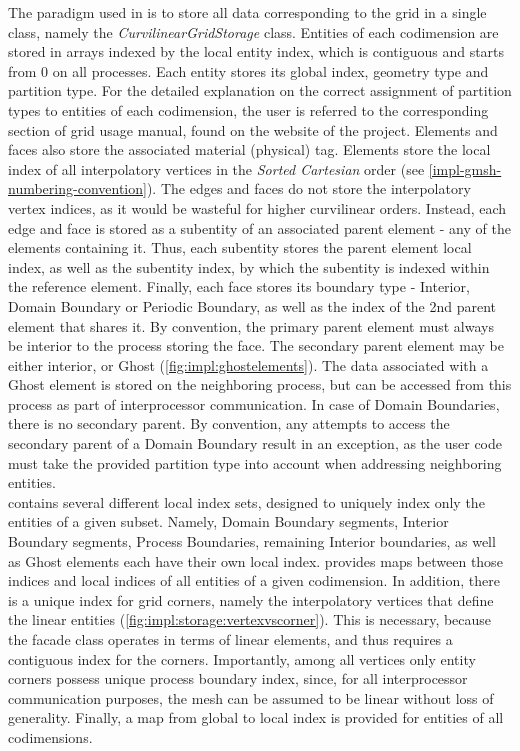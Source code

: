 \noindent
The paradigm used in \curvgrid{} is to store all data corresponding to the grid in a single class, namely the \textit{CurvilinearGridStorage} class. Entities of each codimension are stored in arrays indexed by the local entity index, which is contiguous and starts from 0 on all processes. Each entity stores its global index, geometry type and partition type. For the detailed explanation on the correct assignment of partition types to entities of each codimension, the user is referred to the corresponding section of \dune{} grid usage manual, found on the website of the project. Elements and faces also store the associated material (physical) tag. Elements store the local index of all interpolatory vertices in the \textit{Sorted Cartesian} order (see \cref{impl-gmsh-numbering-convention}). The edges and faces do not store the interpolatory vertex indices, as it would be wasteful for higher curvilinear orders. Instead, each edge and face is stored as a subentity of an associated parent element - any of the elements containing it. Thus, each subentity stores the parent element local index, as well as the subentity index, by which the subentity is indexed within the reference element. Finally, each face stores its boundary type - Interior, Domain Boundary or Periodic Boundary, as well as the index of the 2nd parent element that shares it. By convention, the primary parent element must always be interior to the process storing the face. The secondary parent element may be either interior, or Ghost (\cref{fig:impl:ghostelements}). The data associated with a Ghost element is stored on the neighboring process, but can be accessed from this process as part of interprocessor communication. In case of Domain Boundaries, there is no secondary parent. By convention, any attempts to access the secondary parent of a Domain Boundary result in an exception, as the user code must take the provided partition type into account when addressing neighboring entities. \\

\noindent
\curvgrid{} contains several different local index sets, designed to uniquely index only the entities of a given subset. Namely, Domain Boundary segments, Interior Boundary segments, Process Boundaries, remaining Interior boundaries, as well as Ghost elements each have their own local index. \curvgrid{} provides maps between those indices and local indices of all entities of a given codimension. In addition, there is a unique index for grid corners, namely the interpolatory vertices that define the linear entities (\cref{fig:impl:storage:vertexvscorner}). This is necessary, because the \dune{} facade class operates in terms of linear elements, and thus requires a contiguous index for the corners. Importantly, among all vertices only entity corners possess unique process boundary index, since, for all interprocessor communication purposes, the mesh can be assumed to be linear without loss of generality. Finally, a map from global to local index is provided for entities of all codimensions. \\

